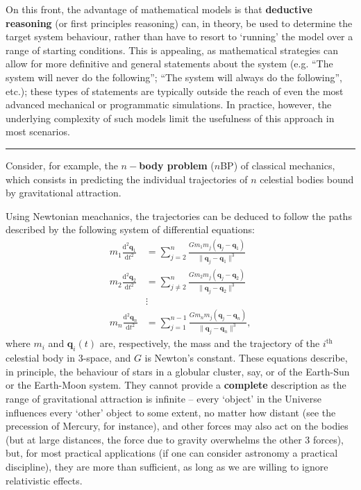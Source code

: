 On this front, the advantage of mathematical models is that \textbf{deductive reasoning} (or first principles reasoning) can, in theory, be used to determine the target system behaviour, rather than have to resort to `running' the model over a range of starting conditions. This is appealing, as mathematical strategies can allow for more definitive and general statements about the system (e.g. ``The system will never do the following''; ``The system will always do the following'', etc.); these types of  statements are typically outside the reach of even the most advanced  mechanical or programmatic simulations. In practice, however, the underlying complexity of such models limit the usefulness of this approach in most scenarios.
\begin{center}\rule{0.5\linewidth}{.4pt}\end{center}
Consider, for example, the \textbf{$n-$body problem} ($n$BP) of classical mechanics, which consists in predicting the individual trajectories of $n$ celestial bodies bound by gravitational attraction. \par Using Newtonian meachanics, the trajectories can be deduced to follow the paths described by the following system of differential equations: 
\begin{align*}
m_1\frac{\textrm{d}^2\mathbf{q}_1}{\textrm{d}t^2}&=\sum_{j=2}^n\frac{Gm_1m_j(\mathbf{q}_j-\mathbf{q}_1)}{\|\mathbf{q}_j-\mathbf{q}_1\|^3} \\
m_2\frac{\textrm{d}^2\mathbf{q}_2}{\textrm{d}t^2}&=\sum_{j\neq 2}^n\frac{Gm_2m_j(\mathbf{q}_j-\mathbf{q}_2)}{\|\mathbf{q}_j-\mathbf{q}_2\|^3} \\
& \vdots \\ 
m_n\frac{\textrm{d}^2\mathbf{q}_n}{\textrm{d}t^2}&=\sum_{j= 1}^{n-1}\frac{Gm_nm_j(\mathbf{q}_j-\mathbf{q}_n)}{\|\mathbf{q}_j-\mathbf{q}_n\|^3},
\end{align*}
where $m_i$ and $\mathbf{q}_i(t)$ are, respectively, the mass and the trajectory of the $i^{\textrm{th}}$ celestial body in 3-space, and $G$ is Newton's constant. These equations describe, in principle,  the behaviour of stars in a globular cluster, say, or of the Earth-Sun or the Earth-Moon system. They cannot provide a \textbf{complete} description as the range of gravitational attraction is infinite -- every `object' in the Universe influences every `other' object to some extent, no matter how distant (see the precession of Mercury, for instance), and other forces may also act on the bodies (but at large distances, the force due to gravity overwhelms the other 3 forces), but, for most practical applications (if one can consider astronomy a practical discipline), they are more than sufficient, as long as we are willing to ignore relativistic effects.  
